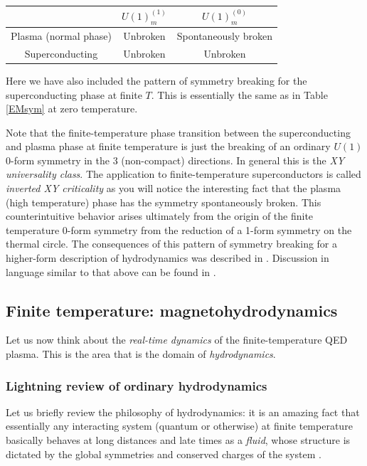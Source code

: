 \documentclass[aps,preprint,nofootinbib,preprintnumbers,eqsecnum,superscriptaddress]{revtex4}
\numberwithin{equation}{section}
\begin{document}
\begin{table}[h]
\centering
\begin{tabular}{c|c|c}
& $U(1)^{(1)}_m$ & $U(1)^{(0)}_m$ \\
\hline
Plasma (normal phase) & Unbroken & Spontaneously broken \\
Superconducting & Unbroken & Unbroken \\ 
\end{tabular}
\end{table}

Here we have also included the pattern of symmetry breaking for the superconducting phase at finite $T$. This is essentially the same as in Table \ref{EMsym} at zero temperature. 

Note that the finite-temperature phase transition between the superconducting and plasma phase at finite temperature is just the breaking of an ordinary $U(1)$ 0-form symmetry in the 3 (non-compact) directions. In general this is the {\it XY universality class}. The application to finite-temperature superconductors is called {\it inverted XY criticality} \cite{Peskin:1977kp,dasgupta1981phase,kiometzis1994critical,herbut1996critical} as you will notice the interesting fact that the plasma (high temperature) phase has the symmetry spontaneously broken. This counterintuitive behavior arises ultimately from the origin of the finite temperature 0-form symmetry from the reduction of a 1-form symmetry on the thermal circle. The consequences of this pattern of symmetry breaking for a higher-form description of hydrodynamics was described in \cite{Armas:2018zbe,Armas:2018atq}. Discussion in language similar to that above can be found in \cite{Iqbal:2020lrt,Das:2023vls}. 

\subsection{Finite temperature: magnetohydrodynamics} 
Let us now think about the {\it real-time dynamics} of the finite-temperature QED plasma. This is the area that is the domain of {\it hydrodynamics}. 

\subsubsection{Lightning review of ordinary hydrodynamics} 

Let us briefly review the philosophy of hydrodynamics: it is an amazing fact that essentially any interacting system (quantum or otherwise) at finite temperature basically behaves at long distances and late times as a {\it fluid}, whose structure is dictated by the global symmetries and conserved charges of the system \cite{landau1987fluid}. 
\end{document}
